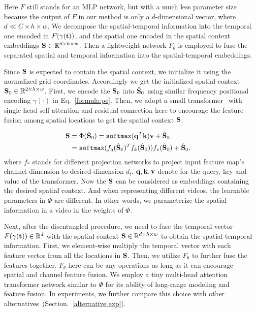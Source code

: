 \documentclass[runningheads]{llncs}
\begin{document}
Here $F$ still stands for an MLP network, but with a much less parameter size because the output of $F$ in our method is only a $d$-dimensional vector, where $d\ll C\times h\times w$. We decompose the spatial-temporal information into the temporal one encoded in $F(\gamma(\mathbf{t}))$, and the spatial one encoded in the spatial context embeddings $\mathbf{S}\in\mathbb{R}^{d\times h\times w}$. Then a lightweight network $F_\theta$ is employed to fuse the separated spatial and temporal information into the spatial-temporal embeddings.

Since $\mathbf{S}$ is expected to contain the spatial context, we initialize it using the normalized grid coordinates. Accordingly we get the initialized spatial context $\mathbf{S}_0\in \mathbb{R}^{2\times h\times w}$. First, we encode the $\mathbf{S}_0$ into $\hat{\mathbf{S}}_0$ using similar frequency positional encoding $\gamma(\cdot)$ in Eq.~\ref{formula:pe}. Then, we adopt a small transformer~\cite{vaswani2017attention} with single-head self-attention and residual connection here to encourage the feature fusion among spatial locations to get the spatial context $\mathbf{S}$:

\begin{equation}
\begin{aligned}
    \mathbf{S} &=\Phi(\hat{\mathbf{S}}_0) = \texttt{softmax}(\mathbf{q}^T\mathbf{k})\mathbf{v} + \hat{\mathbf{S}}_0 \\ 
        &= \texttt{softmax}(f_q(\hat{\mathbf{S}}_0)^T f_k(\hat{\mathbf{S}}_0))f_v(\hat{\mathbf{S}}_0) + \hat{\mathbf{S}}_0.
\end{aligned}
\label{eq:spatial_feature}
\end{equation}
where $f_{*}$ stands for different projection networks to project input feature map's channel dimension to desired dimension $d_t$. $\mathbf{q},\mathbf{k},\mathbf{v}$ denote for the query, key and value of the transformer. Now the $\mathbf{S}$ can be considered as embeddings containing the desired spatial context. And when representing different videos, the learnable parameters in $\Phi$ are different. In other words, we parameterize the spatial information in a video in the weights of $\Phi$.


Next, after the disentangled procedure, we need to fuse the temporal vector $F(\gamma(\mathbf{t}))\in\mathbb{R}^d$ with the spatial context $\mathbf{S}\in\mathbb{R}^{d\times h\times w}$  to obtain the spatial-temporal information. First, we element-wise multiply the temporal vector with each feature vector from all the locations in $\mathbf{S}$. Then, we utilize $F_\theta$ to further fuse the features together. $F_\theta$ here can be any operations as long as it can encourage spatial and channel feature fusion. We employ a tiny multi-head attention transformer network similar to $\Phi$ for its ability of long-range modeling and feature fusion. In experiments, we further compare this choice with other alternatives~(Section.~\ref{alternative exp}). 
\end{document}
